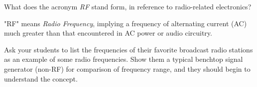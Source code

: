 

What does the acronym {\it RF} stand form, in reference to radio-related electronics?







"RF" means {\it Radio Frequency}, implying a frequency of alternating current (AC) much greater than that encountered in AC power or audio circuitry.







Ask your students to list the frequencies of their favorite broadcast radio stations as an example of some radio frequencies.  Show them a typical benchtop signal generator (non-RF) for comparison of frequency range, and they should begin to understand the concept.





